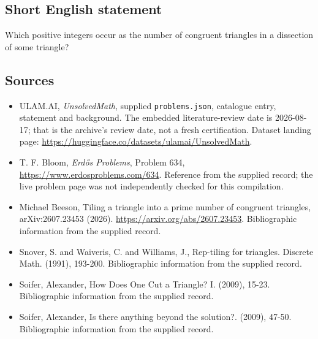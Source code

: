 \documentclass[11pt,a4paper]{article}
\begin{document}
\subsection{Short English statement}

Which positive integers occur as the number of congruent triangles in a dissection of some triangle?

\subsection{Sources}

{\small

\begin{itemize}

\item[\hypertarget{source:statement:1}{S1}] ULAM.AI, \emph{UnsolvedMath}, supplied \texttt{problems.json}, catalogue entry, statement and background. The embedded literature-review date is 2026-08-17; that is the archive’s review date, not a fresh certification. Dataset landing page: \url{https://huggingface.co/datasets/ulamai/UnsolvedMath}.

\item[\hypertarget{source:statement:2}{S2}] T. F. Bloom, \emph{Erdős Problems}, Problem 634, \url{https://www.erdosproblems.com/634}. Reference from the supplied record; the live problem page was not independently checked for this compilation.

\item[\hypertarget{source:statement:3}{S3}] Michael Beeson, Tiling a triangle into a prime number of congruent triangles, arXiv:2607.23453 (2026). \url{https://arxiv.org/abs/2607.23453}. Bibliographic information from the supplied record.

\item[\hypertarget{source:statement:4}{S4}] Snover, S. and Waiveris, C. and Williams, J., Rep-tiling for triangles. Discrete Math. (1991), 193-200. Bibliographic information from the supplied record.

\item[\hypertarget{source:statement:5}{S5}] Soifer, Alexander, How Does One Cut a Triangle? I. (2009), 15-23. Bibliographic information from the supplied record.

\item[\hypertarget{source:statement:6}{S6}] Soifer, Alexander, Is there anything beyond the solution?. (2009), 47-50. Bibliographic information from the supplied record.

\end{itemize}

}

\label{end:statement}
\end{document}

